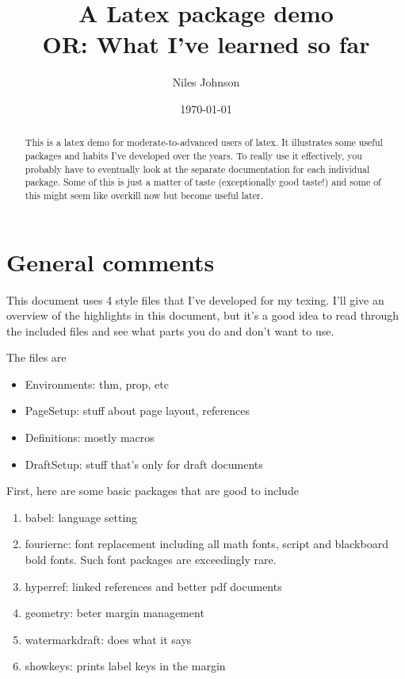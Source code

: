 \documentclass[11pt,oneside,draft]{amsart}
\title[Latex package demo]{A Latex package demo\\ OR: What I've learned so far}
\author{Niles Johnson}
\date{\today}
\begin{document}
\begin{abstract}
  This is a latex demo for moderate-to-advanced users of latex.  It illustrates
  some useful packages and habits I've developed over the years.  To
  really use it effectively, you probably have to eventually look at
  the separate documentation for each individual package.  Some of
  this is just a matter of taste (exceptionally good taste!) and some
  of this might seem like overkill now but become useful later.
\end{abstract}

\maketitle

\tableofcontents

\section{General comments}

This document uses 4 style files that I've developed for my texing.
I'll give an overview of the highlights in this document, but it's a
good idea to read through the included files and see what parts you do
and don't want to use.

The files are
\begin{itemize}
\item Environments: thm, prop, etc
\item PageSetup: stuff about page layout, references
\item Definitions: mostly macros
\item DraftSetup: stuff that's only for draft documents
\end{itemize}

First, here are some basic packages that are good to include
\begin{enumerate}
\item babel: language setting
\item fouriernc: font replacement including all math fonts, script and
  blackboard bold fonts.  Such font packages are exceedingly rare.
\item hyperref: linked references and better pdf documents
\item geometry: beter margin management
\item watermarkdraft: does what it says
\item showkeys: prints label keys in the margin
\end{enumerate}
\end{document}
